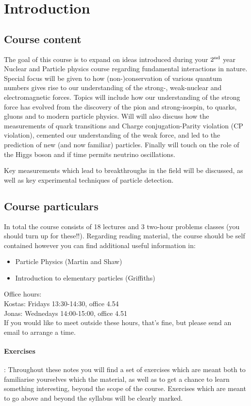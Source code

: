 \section{Introduction}
\subsection{Course content}
The goal of this course is to expand on ideas
introduced during your $2^{\rm nd}$ year Nuclear and Particle physics 
course regarding fundamental interactions in nature. Special focus will be given to how (non-)conservation of various quantum numbers gives rise to our understanding of the strong-, weak-nuclear and electromagnetic forces. Topics will include 
how our understanding of the strong force has evolved from the discovery of the pion and strong-isospin, to quarks, gluons and to modern particle physics. Will will also discuss how the measurements of quark transitions and Charge conjugation-Parity violation (CP violation), cemented our understanding of the weak force, and led to the prediction of new (and now familiar) particles. Finally will touch on the role of the Higgs boson and if time permits neutrino oscillations.

Key measurements which lead to breakthroughs in the field will be discussed, as well as key experimental techniques of particle detection.

\subsection{Course particulars}
In total the course consists of 18 lectures and 3 two-hour problems classes 
(you should turn up for these!!). Regarding reading material, the course should be self contained however you can find additional useful information in:
\begin{itemize}
\item Particle Physics (Martin and Shaw)
\item Introduction to elementary particles (Griffiths) 
\end{itemize}
Office hours: \\
Kostas: Fridays 13:30-14:30, office 4.54\\
Jonas: Wednedays 14:00-15:00, office 4.51\\
If you would like to meet outside these hours, that's fine, but please send an email to arrange a time.

\paragraph{Exercises}: Throughout these notes you will find a set of exercises which are meant both to familiarise yourselves which the material, as well as to get a chance to learn something interesting, beyond the scope of the course. Exercises which are meant to go above and beyond the syllabus will be clearly marked.

